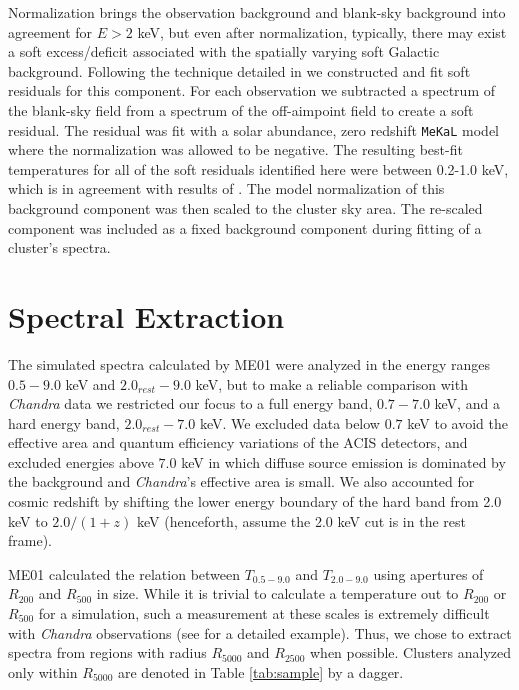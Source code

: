 \documentclass{emulateapj}
\begin{document}
Normalization brings the observation background and blank-sky
background into agreement for $E > 2$ keV, but even after
normalization, typically, there may exist a soft excess/deficit
associated with the spatially varying soft Galactic
background. Following the technique detailed in
\cite{2005ApJ...628..655V} we constructed and fit soft residuals for
this component. For each observation we subtracted a spectrum of the
blank-sky field from a spectrum of the off-aimpoint field to create a
soft residual. The residual was fit with a solar abundance, zero
redshift {\tt MeKaL} model \citep{1985A&AS...62..197M,
1986A&AS...65..511M, 1992SRON, 1995ApJ...438L.115L} where the
normalization was allowed to be negative. The resulting best-fit
temperatures for all of the soft residuals identified here were
between 0.2-1.0 keV, which is in agreement with results of
\cite{2005ApJ...628..655V}. The model normalization of this background
component was then scaled to the cluster sky area. The re-scaled
component was included as a fixed background component during fitting
of a cluster's spectra.

\section{Spectral Extraction} \label{sec:extraction}

The simulated spectra calculated by ME01 were analyzed in the energy
ranges $0.5-9.0$ keV and $2.0_{rest}-9.0$ keV, but to make a reliable
comparison with {\it Chandra} data we restricted our focus to a
full energy band, $0.7-7.0$ keV, and a hard energy band,
$2.0_{rest}-7.0$ keV. We excluded data below $0.7$ keV to avoid the
effective area and quantum efficiency variations of the ACIS
detectors, and excluded energies above $7.0$ keV in which diffuse source
emission is dominated by the background and {\it Chandra}'s
effective area is small. We also accounted for cosmic redshift by
shifting the lower energy boundary of the hard band from 2.0 keV to
$2.0/(1+z)$ keV (henceforth, assume the 2.0 keV cut is in the rest
frame).

ME01 calculated the relation between $T_{0.5-9.0}$ and $T_{2.0-9.0}$
using apertures of $R_{200}$ and $R_{500}$ in size. While it is
trivial to calculate a temperature out to $R_{200}$ or $R_{500}$ for
a simulation, such a measurement at these scales is extremely
difficult with {\it Chandra} observations (see \cite{2005ApJ...628..655V} for
a detailed example). Thus, we chose to extract spectra from regions
with radius $R_{5000}$ and $R_{2500}$ when possible. Clusters analyzed
only within $R_{5000}$ are denoted in Table \ref{tab:sample} by a
dagger.
\end{document}

